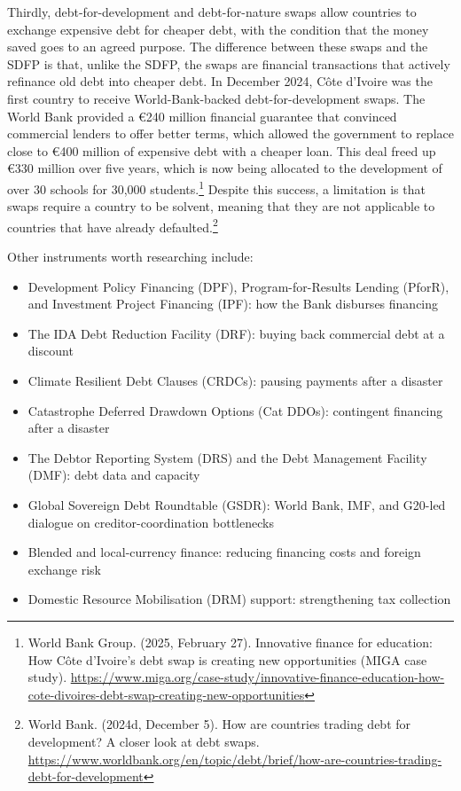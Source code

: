 Thirdly, debt-for-development and debt-for-nature swaps allow countries to exchange expensive debt for cheaper debt, with the condition that the money saved goes to an agreed purpose. The difference between these swaps and the SDFP is that, unlike the SDFP, the swaps are financial transactions that actively refinance old debt into cheaper debt. In December 2024, Côte d’Ivoire was the first country to receive World-Bank-backed debt-for-development swaps. The World Bank provided a €240 million financial guarantee that convinced commercial lenders to offer better terms, which allowed the government to replace close to €400 million of expensive debt with a cheaper loan. This deal freed up €330 million over five years, which is now being allocated to the development of over 30 schools for 30,000 students.\footnote{World Bank Group. (2025, February 27). Innovative finance for education: How Côte d’Ivoire’s debt swap is creating new opportunities (MIGA case study). \url{https://www.miga.org/case-study/innovative-finance-education-how-cote-divoires-debt-swap-creating-new-opportunities}} Despite this success, a limitation is that swaps require a country to be solvent, meaning that they are not applicable to countries that have already defaulted.\footnote{World Bank. (2024d, December 5). How are countries trading debt for development? A closer look at debt swaps. \url{https://www.worldbank.org/en/topic/debt/brief/how-are-countries-trading-debt-for-development}}

Other instruments worth researching include:

\begin{itemize}
  \item Development Policy Financing (DPF), Program-for-Results Lending (PforR), and Investment Project Financing (IPF): how the Bank disburses financing
  \item The IDA Debt Reduction Facility (DRF): buying back commercial debt at a discount
  \item Climate Resilient Debt Clauses (CRDCs): pausing payments after a disaster
  \item Catastrophe Deferred Drawdown Options (Cat DDOs): contingent financing after a disaster
  \item The Debtor Reporting System (DRS) and the Debt Management Facility (DMF): debt data and capacity
  \item Global Sovereign Debt Roundtable (GSDR): World Bank, IMF, and G20-led dialogue on creditor-coordination bottlenecks
  \item Blended and local-currency finance: reducing financing costs and foreign exchange risk
  \item Domestic Resource Mobilisation (DRM) support: strengthening tax collection
\end{itemize}
